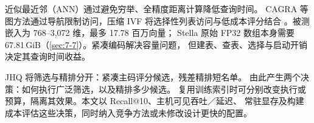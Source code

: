 近似最近邻（ANN）通过避免穷举、全精度距离计算降低查询时间。
CAGRA 等图方法通过导航限制访问，压缩 IVF 将选择性列表访问与低成本评分结合
\cite{cagra,johnson_gpu,ivfrabitq}。被测嵌入为 768--3,072 维，最多 17.78 百万向量；
Stella 原始 FP32 数组本身需要 67.81\,GiB（\cref{sec:7-7}）。紧凑编码解决容量问题，
但建表、查表、选择与启动开销决定其查询时间收益。

JHQ 将筛选与精排分开：紧凑主码评分候选，残差精排短名单\cite{jhq}。
由此产生两个决策：如何执行广泛筛选，以及精排多少候选。
复用训练索引时可分别改变执行或预算，隔离其效果。本文以 Recall@10、主机可见吞吐／延迟、
常驻显存及构建成本评估这些决策，同时纳入竞争方法或未修改设计更快的配置。
